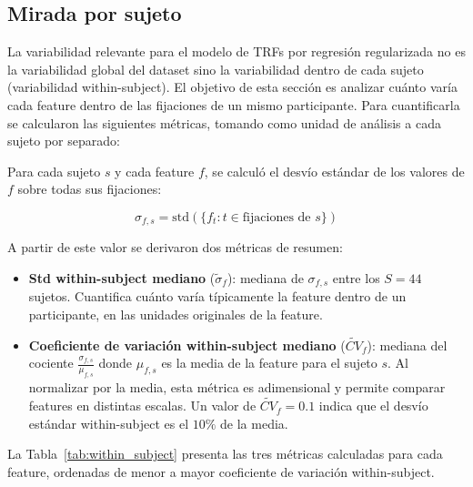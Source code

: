 \subsection{Mirada por sujeto}

La variabilidad relevante para el modelo de TRFs por regresión regularizada no es la variabilidad global del dataset sino la variabilidad dentro de cada sujeto (variabilidad within-subject). El objetivo de esta sección es analizar cuánto varía cada feature dentro de las fijaciones de un mismo participante. Para cuantificarla se calcularon las siguientes métricas, tomando como unidad de análisis a cada sujeto por separado:


Para cada sujeto $s$ y cada feature $f$, se calculó el desvío estándar de los valores de $f$ sobre todas sus fijaciones:

\begin{equation}
    \sigma_{f,s} = \text{std}\left(\{f_t : t \in \text{fijaciones de } s\}\right)
\end{equation}

A partir de este valor se derivaron dos métricas de resumen:

\begin{itemize}
    \item \textbf{Std within-subject mediano} ($\widetilde{\sigma}_f$): 
    mediana de $\sigma_{f,s}$ entre los $S = 44$ sujetos. Cuantifica 
    cuánto varía típicamente la feature dentro de un participante, en 
    las unidades originales de la feature.

    \item \textbf{Coeficiente de variación within-subject mediano} 
    ($\widetilde{CV}_f$): mediana del cociente $\frac{\sigma_{f,s} }{\mu_{f,s}}$
    donde $\mu_{f,s}$ es la media de la feature para el sujeto $s$. Al 
    normalizar por la media, esta métrica es adimensional y permite 
    comparar features en distintas escalas. Un valor de $\widetilde{CV}_f = 0.1$ 
    indica que el desvío estándar within-subject es el $10\%$ de la media.

\end{itemize}

La Tabla~\ref{tab:within_subject} presenta las tres métricas calculadas
para cada feature, ordenadas de menor a mayor coeficiente de variación
within-subject.

